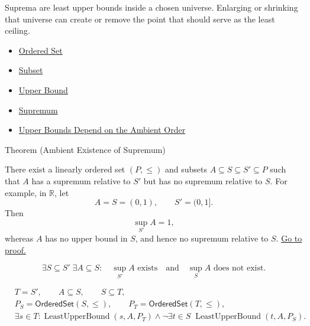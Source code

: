 \begin{remark*}[Interpretation]
Suprema are least upper bounds inside a chosen universe. Enlarging or shrinking that universe can create or remove the point that should serve as the least ceiling.
\end{remark*}

\begin{dependencies}
\begin{itemize}
  \item \hyperref[def:ordered-set]{Ordered Set}
  \item \hyperref[def:subset]{Subset}
  \item \hyperref[def:real-upper-bound]{Upper Bound}
  \item \hyperref[def:supremum]{Supremum}
  \item \hyperref[prop:upper-bounds-ambient-order]{Upper Bounds Depend on the Ambient Order}
\end{itemize}
\end{dependencies}


\begin{theorembox}{Theorem (Ambient Existence of Supremum)}
\begin{theorem}
\label{thm:ambient-existence-supremum}
There exist a linearly ordered set $(P,\leq)$ and subsets
$A\subseteq S\subseteq S'\subseteq P$ such that $A$ has a supremum relative to
$S'$ but has no supremum relative to $S$.  For example, in $\mathbb{R}$, let
\[
  A=S=(0,1),
  \qquad
  S'=(0,1].
\]
Then
\[
  \sup_{S'}A=1,
\]
whereas $A$ has no upper bound in $S$, and hence no supremum relative to $S$.
\hyperref[prf:ambient-existence-supremum]{Go to proof.}
\end{theorem}
\end{theorembox}

\begin{remark*}
\[
\exists S\subseteq S'\;\exists A\subseteq S:
\quad
\sup_{S'} A\text{ exists}
\quad\text{and}\quad
\sup_S A\text{ does not exist}.
\]
\end{remark*}

\begin{remark*}
\[
\begin{aligned}
&T=S',\qquad A\subseteq S,\qquad S\subseteq T,\\
&P_S=\mathsf{OrderedSet}(S,\leq),\qquad
P_T=\mathsf{OrderedSet}(T,\leq),\\
&\exists s\in T:\operatorname{LeastUpperBound}(s,A,P_T)
\land
\neg\exists t\in S\;\operatorname{LeastUpperBound}(t,A,P_S).
\end{aligned}
\]
\end{remark*}


